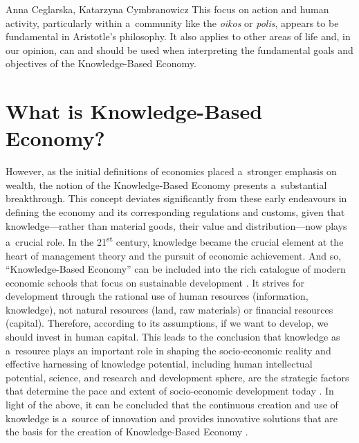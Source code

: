 \begin{artengenv2auth}{Anna Ceglarska, Katarzyna Cymbranowicz}
This focus on action and human activity, particularly within a~community like the \textit{oikos} or \textit{polis}, appears to be fundamental in Aristotle's philosophy. It also applies to other areas of life and, in our opinion, can and should be used when interpreting the fundamental goals and objectives of the Knowledge-Based Economy.



\section{What is Knowledge-Based Economy?}

However, as the initial definitions of economics placed a~stronger emphasis on wealth, the notion of the Knowledge-Based Economy presents a~substantial breakthrough. This concept deviates significantly from these early endeavours in defining the economy and its corresponding regulations and customs, given that knowledge---rather than material goods, their value and distribution---now plays a~crucial role. In the 21\textsuperscript{st} century, knowledge became the crucial element at the heart of management theory and the pursuit of economic achievement. And so, ``Knowledge-Based Economy'' can be included into the rich catalogue of modern economic schools that focus on sustainable development 
\parencites[e.g.,][]{rogall_ekonomia_2010}[][]{shmelev_ecological_2012}[][]{raworth_doughnut_2017}[][]{govender_rise_2021}. %
 It strives for development through the rational use of human resources (information, knowledge), not natural resources (land, raw materials) or financial resources (capital). Therefore, according to its assumptions, if we want to develop, we should invest in human capital. This leads to the conclusion that knowledge as a~resource plays an important role in shaping the socio-economic reality and effective harnessing of knowledge potential, including human intellectual potential, science, and research and development sphere, are the strategic factors that determine the pace and extent of socio-economic development today 
\parencite[][p.193]{skrzypek_gow_2012}. %
 In light of the above, it can be concluded that the continuous creation and use of knowledge is a~source of innovation and provides innovative solutions that are the basis for the creation of Knowledge-Based Economy 
\parencite[][p.15]{zienkowski_gospodarka_2003}. %

\end{artengenv2auth}

